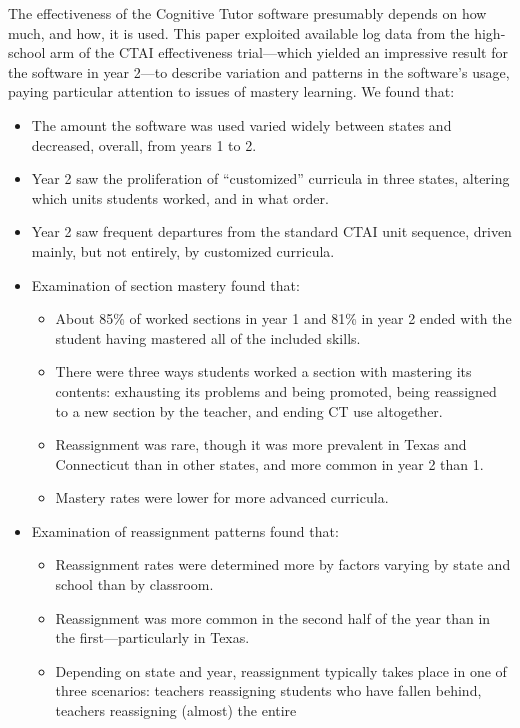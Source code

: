 \documentclass[12pt]{article}\usepackage[]{graphicx}\usepackage[]{color}
\begin{document}
The effectiveness of the Cognitive Tutor software presumably depends
on how much, and how, it is used.
This paper exploited available log data from the high-school arm of the CTAI
effectiveness trial---which yielded an impressive result for the
software in year 2---to describe variation and patterns in the software's
usage, paying particular attention to issues of mastery learning.
We found that:
\begin{itemize}
 \item The amount the software was used varied widely between states
   and decreased, overall, from years 1 to 2.
 \item Year 2 saw the proliferation of ``customized'' curricula in
   three states, altering which units students worked, and in what
   order.
 \item Year 2 saw frequent departures from the standard CTAI unit
   sequence, driven mainly, but not entirely, by customized
   curricula.
 \item Examination of section mastery found that:
 \begin{itemize}
  \item About 85\% of
    worked sections in year 1 and
    81\% in  year 2 ended
    with the student having mastered all of the included skills.
  \item There were three ways students worked a section with
    mastering its contents: exhausting its problems and being
    promoted, being reassigned to a new section by the teacher, and
    ending CT use altogether.
  \item Reassignment was rare, though it was more prevalent in Texas
    and Connecticut than in other states, and more common in year 2
    than 1.
  \item Mastery rates were lower for more advanced curricula.
 \end{itemize}
 \item Examination of reassignment patterns found that:
  \begin{itemize}
   \item Reassignment rates were determined more by factors varying by state and school
     than by classroom.
   \item Reassignment was more common in the second half of the year
     than in the first---particularly in Texas.
   \item Depending on state and year, reassignment typically takes
     place in one of three scenarios: teachers reassigning students
     who have fallen behind, teachers reassigning (almost) the entire

\end{itemize}
\end{itemize}
\end{document}
